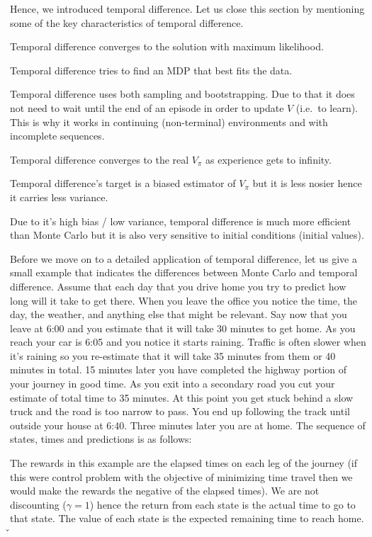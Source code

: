 Hence, we introduced temporal difference. Let us close this section by mentioning some of the key characteristics of
temporal difference.
\bit
\item Temporal difference converges to the solution with maximum likelihood.
\item Temporal difference tries to find an MDP that best fits the data.
\item Temporal difference uses both sampling and bootstrapping. Due to that it does not need to wait until the end of
an episode in order to update $V$ (i.e.\ to learn). This is why it works in continuing (non-terminal) environments and
with incomplete sequences.
\item Temporal difference converges to the real $V_\pi$ as experience gets to infinity.
\item Temporal difference's target is a biased estimator of $V_\pi$ but it is less nosier hence it carries less
variance.
\item Due to it's high bias / low variance, temporal difference is much more efficient than Monte Carlo but it is also
very sensitive to initial conditions (initial values).
\eit

\be
Before we move on to a detailed application of temporal difference, let us give a small example that indicates the
differences between Monte Carlo and temporal difference. Assume that each day that you drive home you try to predict
how long will it take to get there. When you leave the office you notice the time, the day, the weather, and anything
else that might be relevant. Say now that you leave at 6:00 and you estimate that it will take 30 minutes to get home. 
As you reach your car is 6:05 and you notice it starts raining. Traffic is often slower when it's raining so you
re-estimate that it will take 35 minutes from them or 40 minutes in total. 15 minutes later you have completed the
highway portion of your journey in good time. As you exit into a secondary road you cut your estimate of total time
to 35 minutes. At this point you get stuck behind a slow truck and the road is too narrow to pass. You end up
following the track until outside your house at 6:40. Three minutes later you are at home. The sequence of states,
times and predictions is as follows:


The rewards in this example are the elapsed times on each leg of the journey (if this were control problem with the
objective of minimizing time travel then we would make the rewards the negative of the elapsed times). We are not
discounting ($\gamma=1$) hence the return from each state is the actual time to go to that state. The value of each
state is the expected remaining time to reach home. \v

